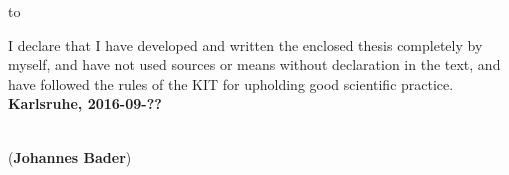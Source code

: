 
\vspace*{37\baselineskip}
\hbox to \textwidth{\hrulefill}
\par
I declare that I have developed and written the enclosed thesis completely by myself, and have not used sources or means without declaration  in the text, and have followed the rules of the KIT for upholding good scientific practice.\\

\textbf{Karlsruhe, 2016-09-??}
\vspace{1.5cm}
 
\dotfill\hspace*{8.0cm}\\
\hspace*{2cm}(\textbf{Johannes Bader}) %

